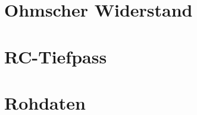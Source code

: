 \documentclass[12pt]{article}
\begin{document}
\section{Ohmscher Widerstand}



\section{RC-Tiefpass}



\section{Rohdaten}


\end{document}
